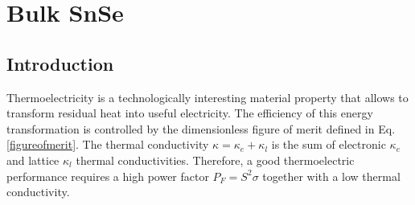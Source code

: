 
\chapter{Bulk SnSe} %

\label{Chapter5} %




\section{Introduction}

Thermoelectricity is a technologically interesting material property that allows to transform residual heat into useful electricity\cite{goldsmid2010introduction,behnia2015fundamentals}. The efficiency of this energy 
transformation is controlled by the dimensionless figure of merit defined in Eq. \ref{figureofmerit}.
The thermal conductivity $\kappa=\kappa_{e}+\kappa_{l}$ is the sum of electronic $\kappa_{e}$ and lattice 
$\kappa_{l}$ thermal conductivities. Therefore, a good thermoelectric performance requires a high power factor 
$P_{F}=S^{2}\sigma$ together with a low thermal conductivity. \\

